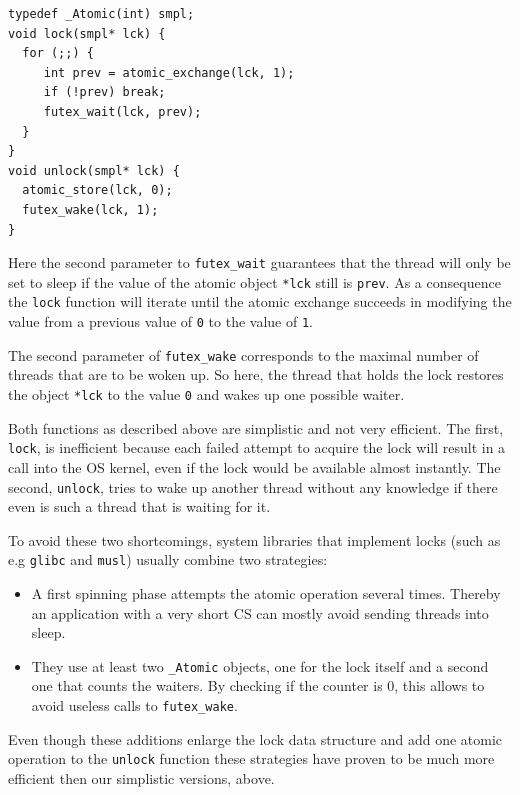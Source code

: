 \lstset{language=C11,label= ,caption= ,numbers=none}
\begin{lstlisting}
typedef _Atomic(int) smpl;
void lock(smpl* lck) {
  for (;;) {
     int prev = atomic_exchange(lck, 1);
     if (!prev) break;
     futex_wait(lck, prev);
  }
}
void unlock(smpl* lck) {
  atomic_store(lck, 0);
  futex_wake(lck, 1);
}
\end{lstlisting}

Here the second parameter to \texttt{futex\_wait} guarantees that the thread
will only be set to sleep if the value of the atomic object \texttt{*lck}
still is \texttt{prev}. As a consequence the \texttt{lock} function will iterate until the
atomic exchange succeeds in modifying the value from a previous
value of \texttt{0} to the value of \texttt{1}.

The second parameter of \texttt{futex\_wake} corresponds to the maximal
number of threads that are to be woken up. So here, the thread that
holds the lock restores the object \texttt{*lck} to the value \texttt{0} and wakes
up one possible waiter.

Both functions as described above are simplistic and not very
efficient. The first, \texttt{lock}, is inefficient because each failed
attempt to acquire the lock will result in a call into the OS
kernel, even if the lock would be available almost instantly.  The
second, \texttt{unlock}, tries to wake up another thread without any
knowledge if there even is such a thread that is waiting for it.

To avoid these two shortcomings, system libraries that implement
locks (such as e.g \texttt{glibc} and \texttt{musl}) usually combine two
strategies:\itemadjust

\begin{itemize}
\item A first spinning phase attempts the atomic operation several
times. Thereby an application with a very short CS can mostly
avoid sending threads into sleep.\itemadjust

\item They use at least two \texttt{\_Atomic} objects, one for the lock itself
and a second one that counts the waiters. By checking if the
counter is 0, this allows to avoid useless calls to
\texttt{futex\_wake}.\itemadjust
\end{itemize}

Even though these additions enlarge the lock data structure and add
one atomic operation to the \texttt{unlock} function these strategies have
proven to be much more efficient then our simplistic versions,
above.

